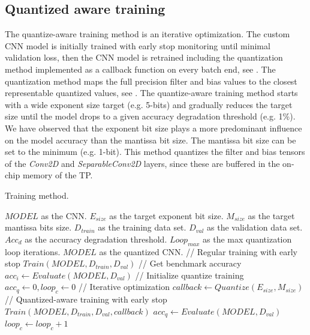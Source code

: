 \subsection{\textbf{Quantized aware training}}
The quantize-aware training method is an iterative optimization. The custom CNN model is initially trained with early stop monitoring until minimal validation loss, then the CNN model is retrained including the quantization method implemented as a callback function on every batch end, see . The quantization method maps the full precision filter and bias values to the closest representable quantized values, see . The quantize-aware training method starts with a wide exponent size target (e.g. 5-bits) and gradually reduces the target size until the model drops to a given accuracy degradation threshold (e.g. 1\%). We have observed that the exponent bit size plays a more predominant influence on the model accuracy than the mantissa bit size. The mantissa bit size can be set to the minimum (e.g. 1-bit). This method quantizes the filter and bias tensors of the \emph{Conv2D} and \emph{SeparableConv2D} layers, since these are buffered in the on-chip memory of the TP.

\begin{algorithm}[h!]
	\label{alg:training}
	\caption{Training method.}
	\begin{algorithmic}
		\SetAlgoLined
		\renewcommand{\algorithmicrequire}{\textbf{input:}}
		\renewcommand{\algorithmicensure}{\textbf{output:}}
		\REQUIRE $MODEL$ as the CNN.
		\REQUIRE $E_{size}$ as the target exponent bit size.
		\REQUIRE $M_{size}$ as the target mantissa bits size.
		\REQUIRE $D_{train}$ as the training data set.
		\REQUIRE $D_{val}$ as the validation data set.
		\REQUIRE $Acc_d$ as the accuracy degradation threshold.
		\REQUIRE $Loop_{max}$ as the max quantization loop iterations.
		\ENSURE $MODEL$ as the quantized CNN.
		\STATE // Regular training with early stop
		\STATE $Train(MODEL, D_{train}, D_{val})$
		\STATE // Get benchmark accuracy
		\STATE $acc_i \gets Evaluate(MODEL, D_{val})$
		\STATE // Initialize quantize training
		\STATE $acc_q \gets 0, loop_c \gets 0$
		\STATE // Iterative optimization
		\STATE $callback \gets Quantize(E_{size}, M_{size})$
		\STATE // Quantized-aware training with early stop
		\STATE $Train(MODEL, D_{train}, D_{val}, callback)$
		\STATE $acc_q \gets Evaluate(MODEL, D_{val})$
		\STATE $loop_c \gets loop_c + 1$
		\ENDWHILE
	\end{algorithmic}
\end{algorithm}

